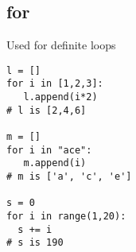\subsection{for}
Used for definite loops

\begin{lstlisting}
l = []
for i in [1,2,3]:
   l.append(i*2)
# l is [2,4,6]

m = []
for i in "ace":
   m.append(i)
# m is ['a', 'c', 'e']

s = 0
for i in range(1,20):
  s += i
# s is 190

\end{lstlisting}
